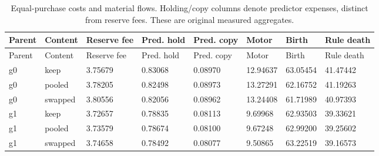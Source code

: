 \begin{longtable}{llllllll}
\caption{Equal-purchase costs and material flows. Holding/copy columns denote predictor expenses, distinct from reserve fees. These are original measured aggregates.}\label{tab:maintenance-equal-costs}\\
\toprule
Parent & Content & Reserve fee & Pred. hold & Pred. copy & Motor & Birth & Rule death \\
\midrule
\endfirsthead
\toprule
Parent & Content & Reserve fee & Pred. hold & Pred. copy & Motor & Birth & Rule death \\
\midrule
\endhead
g0 & keep & 3.75679 & 0.83068 & 0.08970 & 12.94637 & 63.05454 & 41.47442 \\
g0 & pooled & 3.78205 & 0.82498 & 0.08973 & 13.27291 & 62.16752 & 41.19263 \\
g0 & swapped & 3.80556 & 0.82056 & 0.08962 & 13.24408 & 61.71989 & 40.97393 \\
g1 & keep & 3.72657 & 0.78835 & 0.08113 & 9.69968 & 62.93503 & 39.33621 \\
g1 & pooled & 3.73579 & 0.78674 & 0.08100 & 9.67248 & 62.99200 & 39.25602 \\
g1 & swapped & 3.74658 & 0.78492 & 0.08077 & 9.50865 & 63.22519 & 39.16573 \\
\bottomrule
\end{longtable}
